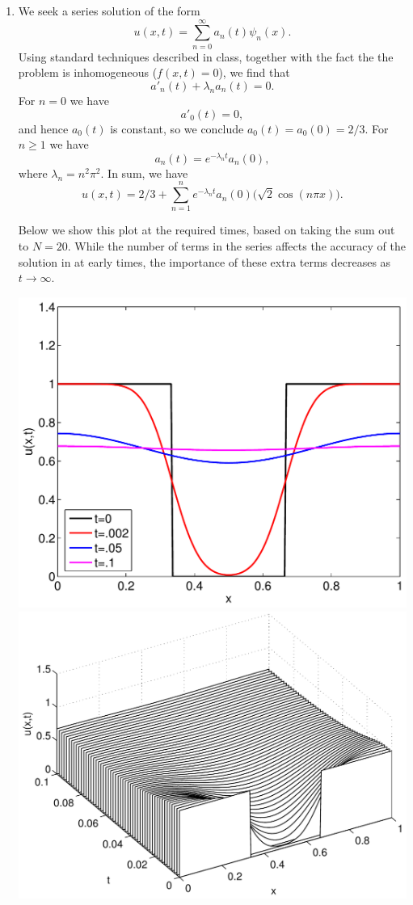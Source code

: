 {\begin{solution}
\begin{enumerate}
\item 
  We seek a series solution of the form
     \[ u(x,t) = \sum_{n=0}^\infty a_n(t) \psi_n(x).\]
  Using standard techniques described in class, together with the
      fact the the problem is inhomogeneous ($f(x,t) = 0$), 
      we find that
        \[ a'_n(t) + \lambda_n a_n(t) = 0.\]
      For $n=0$ we have
        \[ a'_0(t) = 0,\]
      and hence $a_0(t)$ is constant, so we conclude $a_0(t) = a_0(0) = 2/3$.
      For $n\ge 1$ we have
        \[ a_n(t) = e^{-\lambda_n t} a_n(0),\]
      where $\lambda_n = n^2\pi^2$.
      In sum, we have
        \[ u(x,t) = 2/3 + \sum_{n=1}^n e^{-\lambda_n t} 
                                a_n(0) \big(\sqrt{2} \cos(n\pi x) \big).\]

      Below we show this plot at the required times, based on taking the sum
      out to $N=20$.  While the number of terms in the series affects the accuracy
      of the solution in at early times, the importance of these extra terms 
      decreases as $t\to\infty$.
\begin{center}
\includegraphics[scale=0.5]{heateqn2}
\includegraphics[scale=0.5]{heateqn3}
\end{center}


\end{enumerate}
\end{solution}}

